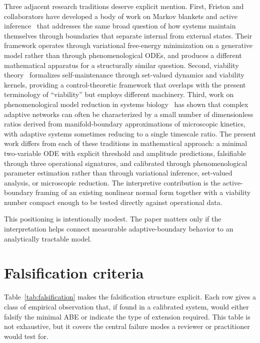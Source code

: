 \documentclass[11pt]{article}
\begin{document}
Three adjacent research traditions deserve explicit mention. First, Friston and collaborators have developed a body of work on Markov blankets and active inference~\cite{friston2013life,kirchhoff2018markov} that addresses the same broad question of how systems maintain themselves through boundaries that separate internal from external states. Their framework operates through variational free-energy minimization on a generative model rather than through phenomenological ODEs, and produces a different mathematical apparatus for a structurally similar question. Second, viability theory~\cite{aubin1991viability} formalizes self-maintenance through set-valued dynamics and viability kernels, providing a control-theoretic framework that overlaps with the present terminology of ``viability'' but employs different machinery. Third, work on phenomenological model reduction in systems biology~\cite{transtrum2015perspective,daniels2015automated} has shown that complex adaptive networks can often be characterized by a small number of dimensionless ratios derived from manifold-boundary approximations of microscopic kinetics, with adaptive systems sometimes reducing to a single timescale ratio. The present work differs from each of these traditions in mathematical approach: a minimal two-variable ODE with explicit threshold and amplitude predictions, falsifiable through three operational signatures, and calibrated through phenomenological parameter estimation rather than through variational inference, set-valued analysis, or microscopic reduction. The interpretive contribution is the active-boundary framing of an existing nonlinear normal form together with a viability number compact enough to be tested directly against operational data.

This positioning is intentionally modest. The paper matters only if the interpretation helps connect measurable adaptive-boundary behavior to an analytically tractable model.

\section{Falsification criteria}
Table~\ref{tab:falsification} makes the falsification structure explicit. Each row gives a class of empirical observation that, if found in a calibrated system, would either falsify the minimal ABE or indicate the type of extension required. This table is not exhaustive, but it covers the central failure modes a reviewer or practitioner would test for.
\end{document}
